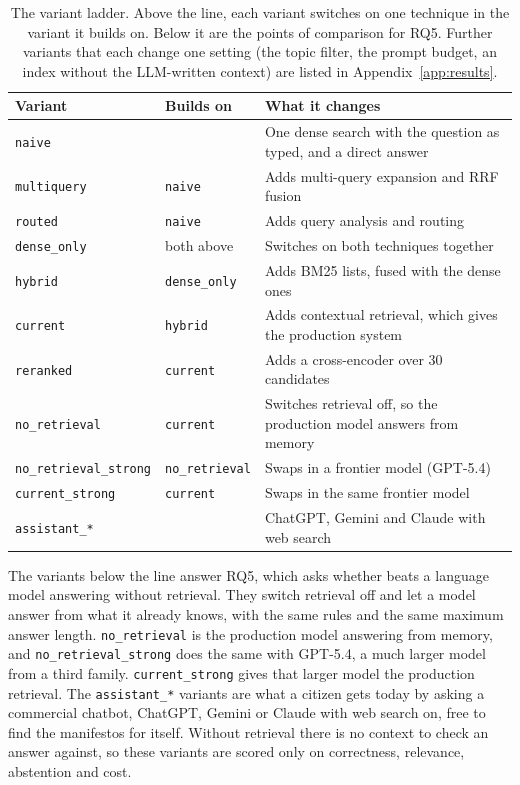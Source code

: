 \begin{table}[htbp]
    \centering
    \small
    \begin{tabular}{|l|l|p{}|}
        \hline
        \textbf{Variant} & \textbf{Builds on} & \textbf{What it changes} \\
        \hline
        \texttt{naive} & & One dense search with the question as typed, and a direct answer \\
        \texttt{multiquery} & \texttt{naive} & Adds multi-query expansion and RRF fusion \\
        \texttt{routed} & \texttt{naive} & Adds query analysis and routing \\
        \texttt{dense\_only} & both above & Switches on both techniques together \\
        \texttt{hybrid} & \texttt{dense\_only} & Adds BM25 lists, fused with the dense ones \\
        \texttt{current} & \texttt{hybrid} & Adds contextual retrieval, which gives the production system \\
        \texttt{reranked} & \texttt{current} & Adds a cross-encoder over 30 candidates \\
        \hline
        \texttt{no\_retrieval} & \texttt{current} & Switches retrieval off, so the production model answers from memory \\
        \texttt{no\_retrieval\_strong} & \texttt{no\_retrieval} & Swaps in a frontier model (GPT-5.4) \\
        \texttt{current\_strong} & \texttt{current} & Swaps in the same frontier model \\
        \texttt{assistant\_*} & & ChatGPT, Gemini and Claude with web search \\
        \hline
    \end{tabular}
    \caption[The variant ladder]{The variant ladder. Above the line, each
    variant switches on one technique in the variant it builds on. Below it are
    the points of comparison for RQ5. Further variants that each change one
    setting (the topic filter, the prompt budget, an index without the
    LLM-written context) are listed in Appendix~\ref{app:results}.}
    \label{tab:ladder}
\end{table}

The variants below the line answer RQ5, which asks whether \sysname{} beats a
language model answering without retrieval. They switch retrieval off and let
a model answer from what it already knows, with the same rules and the same
maximum answer length. \texttt{no\_retrieval} is the production model
answering from memory, and \texttt{no\_retrieval\_strong} does the same with
GPT-5.4, a much larger model from a third family. \texttt{current\_strong}
gives that larger model the production retrieval. The \texttt{assistant\_*}
variants are what a citizen gets today by asking a commercial chatbot, ChatGPT,
Gemini or Claude with web search on, free to find the manifestos for itself.
Without retrieval there is no context to check an answer against, so these
variants are scored only on correctness, relevance, abstention and cost.

